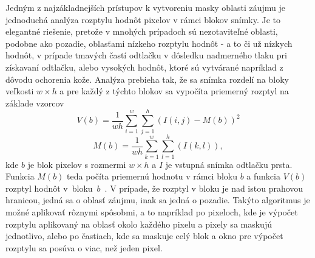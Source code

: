   Jedným z najzákladnejších prístupov k vytvoreniu masky oblasti záujmu je jednoduchá analýza rozptylu hodnôt pixelov v rámci blokov snímky. Je to elegantné
  riešenie, pretože v mnohých prípadoch sú nezotaviteľné oblasti, podobne ako pozadie, oblasťami nízkeho rozptylu hodnôt - a to či už nízkych hodnôt, v prípade
  tmavých častí odtlačku v dôsledku nadmerného tlaku pri získavaní odtlačku, alebo vysokých hodnôt, ktoré sú vytvárané napríklad z dôvodu ochorenia kože.
  Analýza prebieha tak, že sa snímka rozdelí na bloky veľkosti $w\times{}h$ a pre každý z týchto blokov sa vypočíta priemerný rozptyl na základe vzorcov
  \begin{equation}
    V(b) = \frac{1}{wh} \sum_{i=1}^{w}\sum_{j=1}^{h}(I(i,j) - M(b))^2
  \end{equation}
  \begin{equation}
    M(b) = \frac{1}{wh} \sum_{k=1}^{w}\sum_{l=1}^{h}(I(k,l)),
  \end{equation}
  kde $b$ je blok pixelov s rozmermi $w\times{}h$ a $I$ je vstupná snímka odtlačku prsta. Funkcia $M(b)$ teda počíta priemernú hodnotu v rámci bloku $b$
  a funkcia $V(b)$ rozptyl hodnôt v~bloku~{$b$}~{\cite{babatunde2012FP_enhancement}}. V prípade, že rozptyl v bloku je nad istou prahovou hranicou, jedná sa
  o oblasť záujmu, inak sa jedná o pozadie. Takýto algoritmus je možné aplikovať rôznymi spôsobmi, a to napríklad po pixeloch, kde je výpočet rozptylu
  aplikovaný na oblasť okolo každého pixelu a pixely sa maskujú jednotlivo, alebo po častiach, kde sa maskuje celý blok a okno pre výpočet rozptylu sa
  posúva o viac, než jeden pixel.

